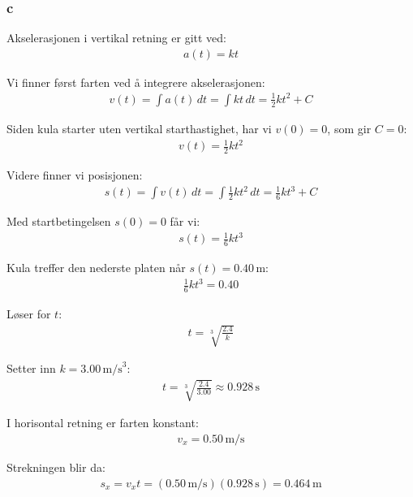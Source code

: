 \subsubsection{c}

Akselerasjonen i vertikal retning er gitt ved:
\begin{align}
a(t) = kt
\end{align}

Vi finner først farten ved å integrere akselerasjonen:
\begin{align}
v(t) = \int a(t)\,dt = \int kt\,dt = \frac{1}{2}kt^2 + C
\end{align}

Siden kula starter uten vertikal starthastighet, har vi $v(0)=0$, som gir $C=0$:
\begin{align}
v(t) = \frac{1}{2}kt^2
\end{align}

Videre finner vi posisjonen:
\begin{align}
s(t) = \int v(t)\,dt = \int \frac{1}{2}kt^2\,dt = \frac{1}{6}kt^3 + C
\end{align}

Med startbetingelsen $s(0)=0$ får vi:
\begin{align}
s(t) = \frac{1}{6}kt^3
\end{align}

Kula treffer den nederste platen når $s(t) = 0.40\,\text{m}$:
\begin{align}
\frac{1}{6}kt^3 = 0.40
\end{align}

Løser for $t$:
\begin{align}
t = \sqrt[3]{\frac{2.4}{k}}
\end{align}

Setter inn $k = 3.00\,\text{m/s}^3$:
\begin{align}
t = \sqrt[3]{\frac{2.4}{3.00}} \approx 0.928\,\text{s}
\end{align}

I horisontal retning er farten konstant:
\begin{align}
v_x = 0.50\,\text{m/s}
\end{align}

Strekningen blir da:
\begin{align}
s_x = v_x t = (0.50\,\text{m/s})(0.928\,\text{s}) = 0.464\,\text{m}
\end{align}
